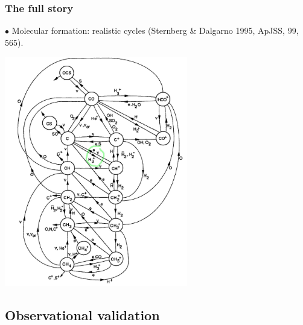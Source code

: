 \begin{frame}
\end{frame} \begin{frame}\frametitle{The full story} 

$\bullet$  Molecular formation: realistic cycles (Sternberg \& Dalgarno 1995, ApJSS, 99, 565).


\begin{center}
\includegraphics[width=0.6\textwidth,height=!]{./B/C_network_2.jpg}
\end{center}

\end{frame}

\subsection{Observational validation}

